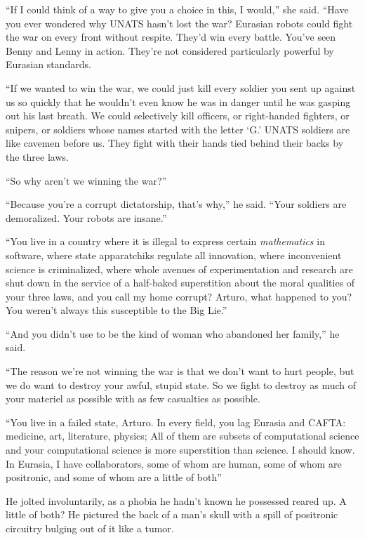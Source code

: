 “If I could think of a way to give you a choice in this, I would,”
she said. “Have you ever wondered why UNATS hasn’t lost the war?
Eurasian robots could fight the war on every front without respite.
They’d win every battle. You’ve seen Benny and Lenny in action.
They’re not considered particularly powerful by Eurasian
standards.

“If we wanted to win the war, we could just kill every soldier you
sent up against us so quickly that he wouldn’t even know he was in
danger until he was gasping out his last breath. We could
selectively kill officers, or right-handed fighters, or snipers, or
soldiers whose names started with the letter ‘G.’ UNATS soldiers
are like cavemen before us. They fight with their hands tied behind
their backs by the three laws.

“So why aren’t we winning the war?”

“Because you’re a corrupt dictatorship, that’s why,” he said. “Your
soldiers are demoralized. Your robots are insane.”

“You live in a country where it is illegal to express certain
\emph{mathematics} in software, where state apparatchiks regulate
all innovation, where inconvenient science is criminalized, where
whole avenues of experimentation and research are shut down in the
service of a half-baked superstition about the moral qualities of
your three laws, and you call my home corrupt? Arturo, what
happened to you? You weren’t always this susceptible to the Big
Lie.”

“And you didn’t use to be the kind of woman who abandoned her
family,” he said.

“The reason we’re not winning the war is that we don’t want to hurt
people, but we do want to destroy your awful, stupid state. So we
fight to destroy as much of your materiel as possible with as few
casualties as possible.

“You live in a failed state, Arturo. In every field, you lag
Eurasia and CAFTA: medicine, art, literature, physics; All of them
are subsets of computational science and your computational science
is more superstition than science. I should know. In Eurasia, I
have collaborators, some of whom are human, some of whom are
positronic, and some of whom are a little of both{\dash}”

He jolted involuntarily, as a phobia he hadn’t known he possessed
reared up. A little of both? He pictured the back of a man’s skull
with a spill of positronic circuitry bulging out of it like a
tumor.

